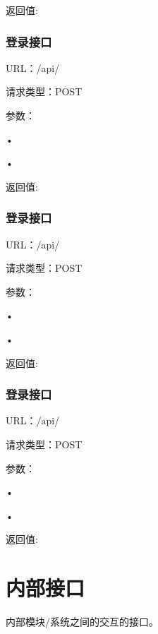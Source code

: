 返回值:

\subsubsection{登录接口}
URL：/api/

请求类型：POST

参数：

• 

• 

返回值:

\subsubsection{登录接口}
URL：/api/

请求类型：POST

参数：

• 

• 

返回值:

\subsubsection{登录接口}
URL：/api/

请求类型：POST

参数： 

• 

• 

返回值:

\section{内部接口}
内部模块/系统之间的交互的接口。